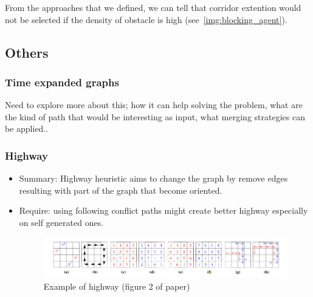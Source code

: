 From the approaches that we defined, we can tell that corridor extention would not be selected if the density of obstacle is high (see~\ref{img:blocking_agent}).





\subsection{Others}
\subsubsection{Time expanded graphs}
Need to explore more about this; how it can help solving the problem, what are the kind of path that would be interesting as input, what merging strategies can be applied..

\subsubsection{Highway}
\begin{itemize}
  \item Summary: Highway\cite{coko16a,courkuxuayko16a} heuristic aims to change the graph by remove edges resulting with part of the graph that become oriented.
  \item Require: using following conflict paths might create better highway especially on self generated\cite{courkuxuayko16a} ones.
  \begin{figure}[H]
    \centering
    \caption{Example of highway (figure 2 of paper\cite{coko16a})}\label{img:highway}
    \includegraphics[width=\widthimg]{img/highways.png}
  \end{figure}
\end{itemize}


